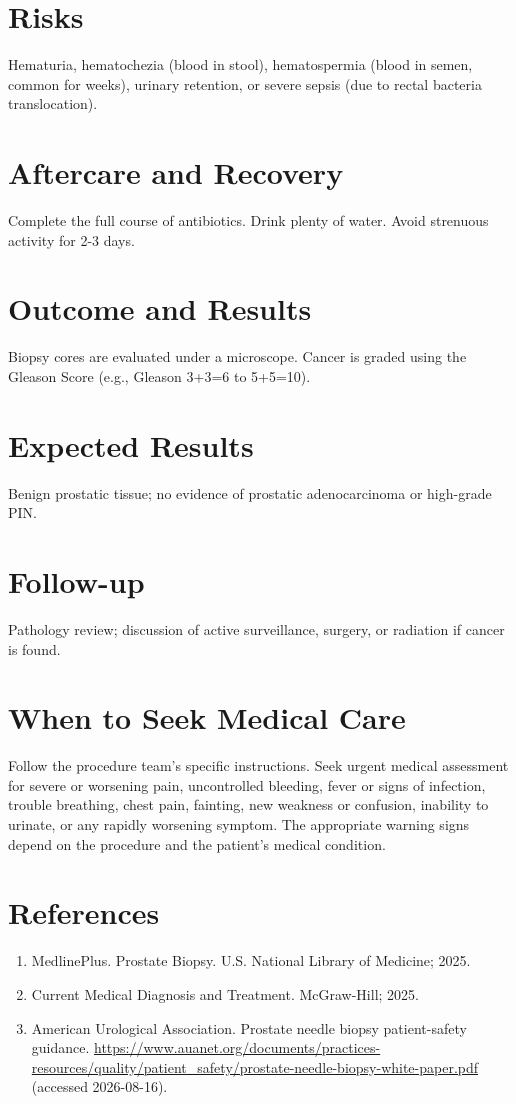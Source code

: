 \section*{Risks}
Hematuria, hematochezia (blood in stool), hematospermia (blood in semen, common for weeks), urinary retention, or severe sepsis (due to rectal bacteria translocation).

\section*{Aftercare and Recovery}
Complete the full course of antibiotics. Drink plenty of water. Avoid strenuous activity for 2-3 days.

\section*{Outcome and Results}
Biopsy cores are evaluated under a microscope. Cancer is graded using the Gleason Score (e.g., Gleason 3+3=6 to 5+5=10).

\section*{Expected Results}
Benign prostatic tissue; no evidence of prostatic adenocarcinoma or high-grade PIN.

\section*{Follow-up}
Pathology review; discussion of active surveillance, surgery, or radiation if cancer is found.

\section*{When to Seek Medical Care}
Follow the procedure team's specific instructions. Seek urgent medical assessment for severe or worsening pain, uncontrolled bleeding, fever or signs of infection, trouble breathing, chest pain, fainting, new weakness or confusion, inability to urinate, or any rapidly worsening symptom. The appropriate warning signs depend on the procedure and the patient's medical condition.

\section*{References}
\begin{enumerate}
  \item MedlinePlus. Prostate Biopsy. U.S. National Library of Medicine; 2025.
  \item Current Medical Diagnosis and Treatment. McGraw-Hill; 2025.
  \item American Urological Association. Prostate needle biopsy patient-safety guidance. \url{https://www.auanet.org/documents/practices-resources/quality/patient_safety/prostate-needle-biopsy-white-paper.pdf} (accessed 2026-08-16).
\end{enumerate}

\clearpage
